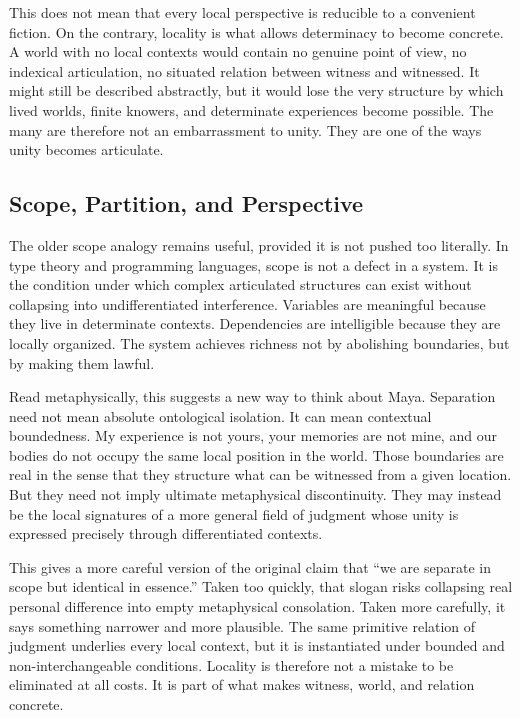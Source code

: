 \documentclass[11pt,a4paper]{article}
\theoremstyle{plain}
\theoremstyle{definition}
\theoremstyle{remark}
\begin{document}
This does not mean that every local perspective is reducible to a convenient fiction.
On the contrary, locality is what allows determinacy to become concrete.
A world with no local contexts would contain no genuine point of view, no indexical articulation, no situated relation between witness and witnessed.
It might still be described abstractly, but it would lose the very structure by which lived worlds, finite knowers, and determinate experiences become possible.
The many are therefore not an embarrassment to unity.
They are one of the ways unity becomes articulate.

\subsection{Scope, Partition, and Perspective}
\label{subsec:scope}

The older scope analogy remains useful, provided it is not pushed too literally.
In type theory and programming languages, scope is not a defect in a system.
It is the condition under which complex articulated structures can exist without collapsing into undifferentiated interference.
Variables are meaningful because they live in determinate contexts.
Dependencies are intelligible because they are locally organized.
The system achieves richness not by abolishing boundaries, but by making them lawful.

Read metaphysically, this suggests a new way to think about Maya.
Separation need not mean absolute ontological isolation.
It can mean contextual boundedness.
My experience is not yours, your memories are not mine, and our bodies do not occupy the same local position in the world.
Those boundaries are real in the sense that they structure what can be witnessed from a given location.
But they need not imply ultimate metaphysical discontinuity.
They may instead be the local signatures of a more general field of judgment whose unity is expressed precisely through differentiated contexts.

This gives a more careful version of the original claim that ``we are separate in scope but identical in essence.''
Taken too quickly, that slogan risks collapsing real personal difference into empty metaphysical consolation.
Taken more carefully, it says something narrower and more plausible.
The same primitive relation of judgment underlies every local context, but it is instantiated under bounded and non-interchangeable conditions.
Locality is therefore not a mistake to be eliminated at all costs.
It is part of what makes witness, world, and relation concrete.
\end{document}

